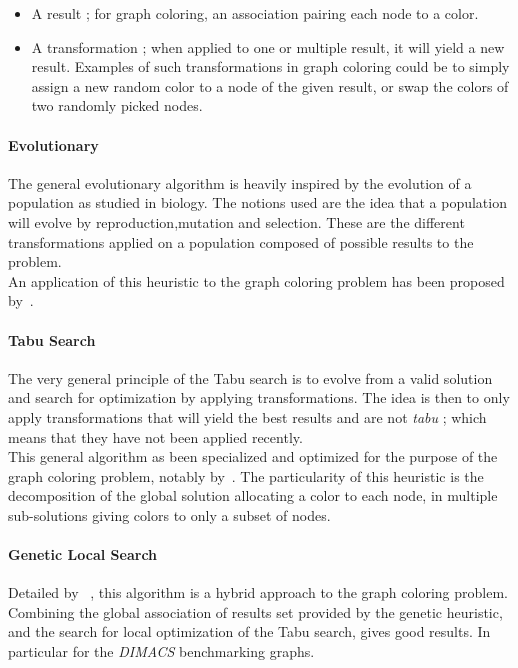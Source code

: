 \documentclass[letterpaper]{article}
\begin{document}
\begin{itemize}
\item A result ; for graph coloring, an association pairing each node to a color.
\item A transformation ; when applied to one or multiple result, it will yield a new result. Examples of such transformations in graph coloring could be to simply assign a new random color to a node of the given result, or swap the colors of two randomly picked nodes.
\end{itemize}

\paragraph{Evolutionary}
The general evolutionary algorithm is heavily inspired by the evolution of a population as studied in biology. The notions used are the idea that a population will evolve by reproduction,mutation and selection. These are the different transformations applied on a population composed of possible results to the problem.\\

An application of this heuristic to the graph coloring problem has been proposed by~\cite{Malaguti2008MAV}.

\paragraph{Tabu Search}
The very general principle of the Tabu search is to evolve from a valid solution and search for optimization by applying transformations. The idea is then to only apply transformations that will yield the best results and are not \emph{tabu} ; which means that they have not been applied recently.\\

This general algorithm as been specialized and optimized for the purpose of the graph coloring problem, notably by~\cite{Blochliger2008GCH}. The particularity of this heuristic is the decomposition of the global solution allocating a color to each node, in multiple sub-solutions giving colors to only a subset of nodes.

\paragraph{Genetic Local Search}
Detailed by ~\cite{Dorne98anew}, this algorithm is a hybrid approach to the graph coloring problem. Combining the global association of results set provided by the genetic heuristic, and the search for local optimization of the Tabu search, gives good results. In particular for the \emph{DIMACS} benchmarking graphs.
\end{document}
